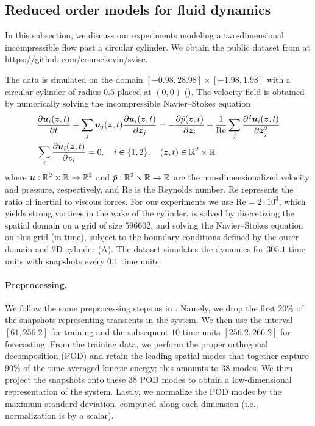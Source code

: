 \subsection{Reduced order models for fluid dynamics}\label{app:subsec:rom}

In this subsection, we discuss our experiments modeling a two-dimensional incompressible flow past a circular cylinder.
We obtain the public dataset from \citet{course2023state} at \url{https://github.com/coursekevin/svise}.

The data is simulated on the domain $[-0.98, 28.98] \times [-1.98, 1.98]$ with a circular cylinder of radius $0.5$ placed at $(0, 0)$ (). The velocity field is obtained by numerically solving the incompressible Navier--Stokes equation
\begin{equation}
\begin{aligned}\label{app:eqn:navier-stokes}
   &\frac{\partial \boldsymbol{u}_i(\boldsymbol{z}, t)}{\partial t} + \sum_j \boldsymbol{u}_j(\boldsymbol{z}, t) \frac{\partial \boldsymbol{u}_i(\boldsymbol{z}, t)}{\partial \boldsymbol{z}_j} = -\frac{\partial \bar{p}(\boldsymbol{z}, t)}{\partial \boldsymbol{z}_i} + \frac{1}{\mathrm{Re}} \sum_j \frac{\partial^2 \boldsymbol{u}_i(\boldsymbol{z}, t)}{\partial \boldsymbol{z}_j^2}\\
   &\sum_i \frac{\partial \boldsymbol{u}_i(\boldsymbol{z}, t)}{\partial \boldsymbol{z}_i} = 0, \quad i \in \{1, 2\}, \quad (\boldsymbol{z}, t) \in \mathbb{R}^2 \times \mathbb{R}
\end{aligned}
\end{equation}
where $\boldsymbol{u}: \mathbb{R}^2 \times \mathbb{R} \to \mathbb{R}^2$ and $\bar{p}: \mathbb{R}^2 \times \mathbb{R} \to \mathbb{R}$ are the non-dimensionalized velocity and pressure, respectively, and $\mathrm{Re}$ is the Reynolds number. 
$\mathrm{Re}$ represents the ratio of inertial to viscous forces. 
For our experiments we use $\mathrm{Re} = 2 \cdot 10^3$, which yields strong vortices in the wake of the cylinder.
 is solved by discretizing the spatial domain on a grid of size $596602$, and solving the Navier--Stokes equation on this grid (in time), subject to the boundary conditions defined by the outer domain and 2D cylinder (A). 
The dataset simulates the dynamics for $305.1$ time units with snapshots every $0.1$ time units.

\paragraph{Preprocessing.}
We follow the same preprocessing steps as in \citet{course2023state}. 
Namely, we drop the first $20\%$ of the snapshots representing transients in the system.
We then use the interval $[61, 256.2]$ for training and the subsequent $10$ time units $[256.2, 266.2]$ for forecasting.
From the training data, we perform the proper orthogonal decomposition (POD) \cite{berkooz1993proper} and retain the leading spatial modes that together capture $90\%$ of the time-averaged kinetic energy; this amounts to $38$ modes. 
We then project the snapshots onto these $38$ POD modes to obtain a low-dimensional representation of the system.
Lastly, we normalize the POD modes by the maximum standard deviation, computed along each dimension (i.e., normalization is by a scalar).

